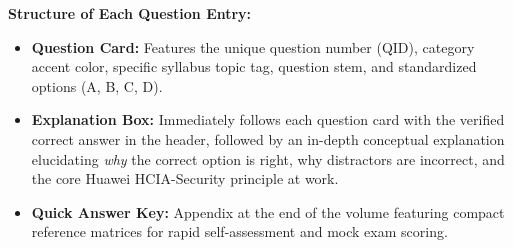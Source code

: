 \vspace{0.8em}
\noindent\textbf{Structure of Each Question Entry:}
\begin{itemize}[leftmargin=1.8em, itemsep=2pt]
    \item \textbf{Question Card:} Features the unique question number (QID), category accent color, specific syllabus topic tag, question stem, and standardized options (A, B, C, D).
    \item \textbf{Explanation Box:} Immediately follows each question card with the verified correct answer in the header, followed by an in-depth conceptual explanation elucidating \textit{why} the correct option is right, why distractors are incorrect, and the core Huawei HCIA-Security principle at work.
    \item \textbf{Quick Answer Key:} Appendix at the end of the volume featuring compact reference matrices for rapid self-assessment and mock exam scoring.
\end{itemize}
\clearpage
